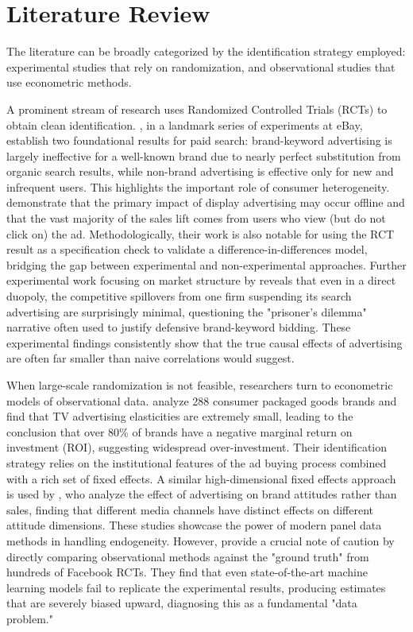\section*{Literature Review}
\label{sec:literature}

The literature can be broadly categorized by the identification strategy employed: experimental studies that rely on randomization, and observational studies that use econometric methods.

A prominent stream of research uses Randomized Controlled Trials (RCTs) to obtain clean identification. \citet{blake2015consumer}, in a landmark series of experiments at eBay, establish two foundational results for paid search: brand-keyword advertising is largely ineffective for a well-known brand due to nearly perfect substitution from organic search results, while non-brand advertising is effective only for new and infrequent users. This highlights the important role of consumer heterogeneity. \citet{lewis2014online} demonstrate that the primary impact of display advertising may occur offline and that the vast majority of the sales lift comes from users who view (but do not click on) the ad. Methodologically, their work is also notable for using the RCT result as a specification check to validate a difference-in-differences model, bridging the gap between experimental and non-experimental approaches. Further experimental work focusing on market structure by \citet{golden2019effects} reveals that even in a direct duopoly, the competitive spillovers from one firm suspending its search advertising are surprisingly minimal, questioning the "prisoner's dilemma" narrative often used to justify defensive brand-keyword bidding. These experimental findings consistently show that the true causal effects of advertising are often far smaller than naive correlations would suggest.

When large-scale randomization is not feasible, researchers turn to econometric models of observational data. \citet{shapiro2021tv} analyze 288 consumer packaged goods brands and find that TV advertising elasticities are extremely small, leading to the conclusion that over 80\% of brands have a negative marginal return on investment (ROI), suggesting widespread over-investment. Their identification strategy relies on the institutional features of the ad buying process combined with a rich set of fixed effects. A similar high-dimensional fixed effects approach is used by \citet{du2019advertising}, who analyze the effect of advertising on brand attitudes rather than sales, finding that different media channels have distinct effects on different attitude dimensions. These studies showcase the power of modern panel data methods in handling endogeneity. However, \citet{gordon2023comparison} provide a crucial note of caution by directly comparing observational methods against the "ground truth" from hundreds of Facebook RCTs. They find that even state-of-the-art machine learning models fail to replicate the experimental results, producing estimates that are severely biased upward, diagnosing this as a fundamental "data problem."

